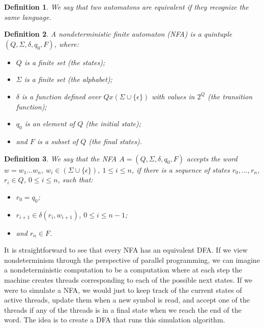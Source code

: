 \documentclass[12pt, a4paper]{article}
\theoremstyle{break}
\newtheorem{definition}{Definition}
\begin{document}
\begin{definition}
  We say that two automatons are equivalent if they recognize the same language.
\end{definition}
  
\begin{definition}
  A nondeterministic finite automaton (NFA) is a quintuple
$(Q,\Sigma,\delta,q_0,F)$, where:
\begin{itemize}
  \item $Q$ is a finite set (the states);
  \item $\Sigma$ is a finite set (the alphabet);
  \item $\delta$ is a function defined over $Q x (\Sigma \cup \{\epsilon\})$ with values in
     $2^Q$ (the transition function);
  \item $q_0$ is an element of $Q$ (the initial state);
  \item and $F$ is a subset of $Q$ (the final states).
\end{itemize}
\end{definition}

\begin{definition}
  We say that the NFA $A = (Q,\Sigma,\delta,q_0,F)$ accepts the word $w = w_1
\ldots w_n$, $w_i \in (\Sigma \cup \{\epsilon \})$, $1 \leq i \leq n$, if there
is a sequence of states $r_0, \ldots, r_n$, $r_i \in Q$, $0 \leq i \leq n$, such
that:
\begin{itemize}
  \item $r_0 = q_0$;
  \item $r_{i+1} \in \delta(r_i, w_{i+1})$, $0 \leq i \leq n-1$;
  \item and $r_n \in F$.
\end{itemize}
\end{definition}
  
It is straightforward to see that every NFA has an equivalent DFA. If we view
nondeterminism through the perspective of parallel programming, we can imagine a
nondeterministic computation to be a computation where at each step the machine
creates threads corresponding to each of the possible next states. If we were
to simulate a NFA, we would just to keep track of the current states of active
threads, update them when a new symbol is read, and accept one of the threads if
any of the threads is in a final state when we reach the end of the word. The
idea is to create a DFA that runs this simulation algorithm.

\end{document}

